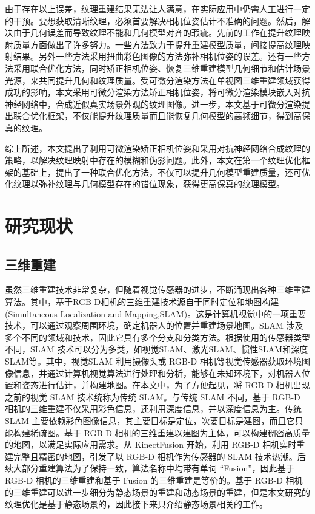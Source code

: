 由于存在以上误差，纹理重建结果无法让人满意，在实际应用中仍需人工进行一定的干预。要想获取清晰纹理，必须首要解决相机位姿估计不准确的问题。然后，解决由于几何误差而导致纹理不能和几何模型对齐的瑕疵。先前的工作在提升纹理映射质量方面做出了许多努力。一些方法致力于提升重建模型质量，间接提高纹理映射结果。另外一些方法采用扭曲彩色图像的方法弥补相机位姿的误差。还有一些方法采用联合优化方法，同时矫正相机位姿、恢复三维重建模型几何细节和估计场景光源，来共同提升几何和纹理质量。受可微分渲染方法在单视图三维重建领域获得成功的影响，本文采用可微分渲染方法矫正相机位姿，将可微分渲染模块嵌入对抗神经网络中，合成近似真实场景外观的纹理图像。进一步，本文基于可微分渲染提出联合优化框架，不仅能提升纹理质量而且能恢复几何模型的高频细节，得到高保真的纹理。\par
综上所述，本文提出了利用可微渲染矫正相机位姿和采用对抗神经网络合成纹理的策略，以解决纹理映射中存在的模糊和伪影问题。此外，本文在第一个纹理优化框架的基础上，提出了一种联合优化方法，不仅可以提升几何模型重建质量，还可优化纹理以弥补纹理与几何模型存在的错位现象，获得更高保真的纹理模型。
\section{研究现状}
\subsection{三维重建}
虽然三维重建技术非常复杂，但随着视觉传感器的进步，不断涌现出各种三维重建算法。其中，基于RGB-D相机的三维重建技术源自于同时定位和地图构建(Simultaneous Localization and Mapping,SLAM)。这是计算机视觉中的一项重要技术，可以通过观察周围环境，确定机器人的位置并重建场景地图。SLAM 涉及多个不同的领域和技术，因此它具有多个分支和分类方法。根据使用的传感器类型不同，SLAM 技术可以分为多类，如视觉SLAM、激光SLAM、惯性SLAM和深度SLAM等。其中，视觉SLAM 利用摄像头或 RGB-D 相机等视觉传感器获取环境图像信息，并通过计算机视觉算法进行处理和分析，能够在未知环境下，对机器人位置和姿态进行估计，并构建地图。在本文中，为了方便起见，将 RGB-D 相机出现之前的视觉 SLAM 技术统称为传统 SLAM。与传统 SLAM 不同，基于 RGB-D 相机的三维重建不仅采用彩色信息，还利用深度信息，并以深度信息为主。传统 SLAM 主要依赖彩色图像信息，其主要目标是定位，次要目标是建图，而且它只能构建稀疏图。基于 RGB-D 相机的三维重建以建图为主体，可以构建稠密高质量的地图，以满足实际应用需求。从 KinectFusion 开始，利用 RGB-D 相机实时重建完整且精密的地图，引发了以 RGB-D 相机作为传感器的 SLAM 技术热潮。后续大部分重建算法为了保持一致，算法名称中均带有单词 “Fusion”，因此基于 RGB-D 相机的三维重建和基于 Fusion 的三维重建是等价的。基于 RGB-D 相机的三维重建可以进一步细分为静态场景的重建和动态场景的重建，但是本文研究的纹理优化是基于静态场景的，因此接下来只介绍静态场景相关的工作。\par

